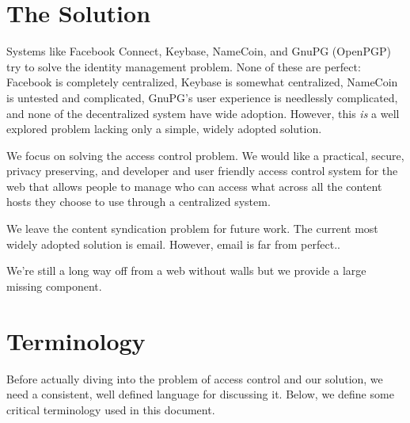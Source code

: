 \documentclass[pdftex,12pt,a4papaer,twoside,notitlepage]{report}
\begin{document}
\section{The Solution}

Systems like Facebook Connect, Keybase, NameCoin, and GnuPG (OpenPGP) try to
solve the identity management problem. None of these are perfect: Facebook is
completely centralized, Keybase is somewhat centralized, NameCoin is untested
and complicated, GnuPG's user experience is needlessly complicated, and none of
the decentralized system have wide adoption. However, this \emph{is} a well
explored problem lacking only a simple, widely adopted solution.

We focus on solving the access control problem. We would like a practical,
secure, privacy preserving, and developer and user friendly access control
system for the web that allows people to manage who can access what across all
the content hosts they choose to use through a centralized system.

We leave the content syndication problem for future work. The current most
widely adopted solution is email. However, email is far from
perfect..

We're still a long way off from a web without walls but we provide a large
missing component.

\section{Terminology}

Before actually diving into the problem of access control and our solution, we
need a consistent, well defined language for discussing it. Below, we define
some critical terminology used in this document.
\end{document}
